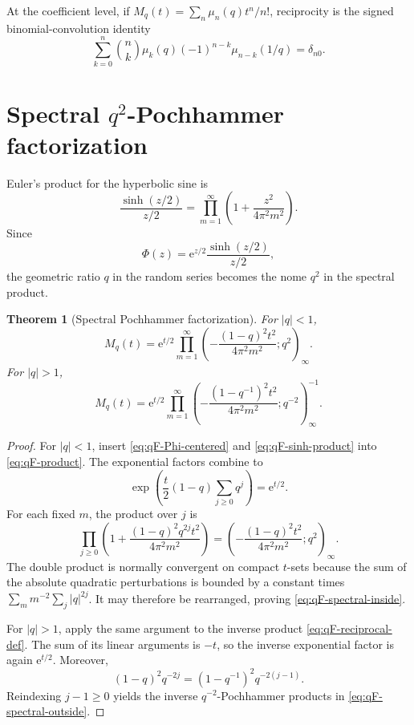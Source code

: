 \documentclass[11pt,oneside,openany]{book}
\newtheorem{theorem}{Theorem}[chapter]
\theoremstyle{definition}
\theoremstyle{remark}
\newcommand{\poch}[3]{(#1;#2)_{#3}}
\newcommand{\e}{\mathrm e}
\begin{document}
At the coefficient level, if
$M_q(t)=\sum_n\mu_n(q)t^n/n!$, reciprocity is the signed binomial-convolution
identity
\begin{equation}\label{eq:qF-moment-convolution}
 \sum_{k=0}^n\binom nk\mu_k(q)(-1)^{n-k}\mu_{n-k}(1/q)
 =\delta_{n0}.
\end{equation}

\section{Spectral \texorpdfstring{$q^2$}{q2}-Pochhammer factorization}

Euler's product for the hyperbolic sine is
\begin{equation}\label{eq:qF-sinh-product}
 \frac{\sinh(z/2)}{z/2}
 =\prod_{m=1}^{\infty}
 \left(1+\frac{z^2}{4\pi^2m^2}\right).
\end{equation}
Since
\begin{equation}\label{eq:qF-Phi-centered}
 \Phi(z)=\e^{z/2}\frac{\sinh(z/2)}{z/2},
\end{equation}
the geometric ratio $q$ in the random series becomes the nome $q^2$ in the
spectral product.

\begin{theorem}[Spectral Pochhammer factorization]\label{thm:qF-spectral}
For $|q|<1$,
\begin{equation}\label{eq:qF-spectral-inside}
 \boxed{
 M_q(t)=\e^{t/2}
 \prod_{m=1}^{\infty}
 \poch{-\dfrac{(1-q)^2t^2}{4\pi^2m^2}}{q^2}{\infty}.}
\end{equation}
For $|q|>1$,
\begin{equation}\label{eq:qF-spectral-outside}
 \boxed{
 M_q(t)=\e^{t/2}
 \prod_{m=1}^{\infty}
 \poch{-\dfrac{(1-q^{-1})^2t^2}{4\pi^2m^2}}{q^{-2}}{\infty}^{-1}.}
\end{equation}
\end{theorem}

\begin{proof}
For $|q|<1$, insert \eqref{eq:qF-Phi-centered} and
\eqref{eq:qF-sinh-product} into \eqref{eq:qF-product}.  The exponential
factors combine to
\[
 \exp\!\left(\frac t2(1-q)\sum_{j\ge0}q^j\right)=\e^{t/2}.
\]
For each fixed $m$, the product over $j$ is
\[
 \prod_{j\ge0}\left(1+
 \frac{(1-q)^2q^{2j}t^2}{4\pi^2m^2}\right)
 =\poch{-\dfrac{(1-q)^2t^2}{4\pi^2m^2}}{q^2}{\infty}.
\]
The double product is normally convergent on compact $t$-sets because the sum
of the absolute quadratic perturbations is bounded by a constant times
$\sum_m m^{-2}\sum_j|q|^{2j}$.  It may therefore be rearranged, proving
\eqref{eq:qF-spectral-inside}.

For $|q|>1$, apply the same argument to the inverse product
\eqref{eq:qF-reciprocal-def}.  The sum of its linear arguments is $-t$, so
the inverse exponential factor is again $\e^{t/2}$.  Moreover,
\[
 (1-q)^2q^{-2j}=(1-q^{-1})^2q^{-2(j-1)}.
\]
Reindexing $j-1\ge0$ yields the inverse $q^{-2}$-Pochhammer products in
\eqref{eq:qF-spectral-outside}.
\end{proof}
\end{document}
